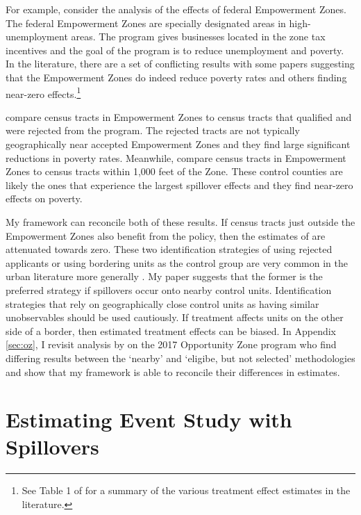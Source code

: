 \documentclass[11pt]{article}
\begin{document}
For example, consider the analysis of the effects of federal Empowerment Zones. The federal Empowerment Zones are specially designated areas in high-unemployment areas. The program gives businesses located in the zone tax incentives and the goal of the program is to reduce unemployment and poverty. In the literature, there are a set of conflicting results with some papers suggesting that the Empowerment Zones do indeed reduce poverty rates and others finding near-zero effects.\footnote{See Table 1 of \citet{Neumark_Young_2019} for a summary of the various treatment effect estimates in the literature.} 

\citet{Busso_Gregory_Kline_2013} compare census tracts in Empowerment Zones to census tracts that qualified and were rejected from the program. The rejected tracts are not typically geographically near accepted Empowerment Zones and they find large significant reductions in poverty rates. Meanwhile, \citet{Neumark_Kolko_2010} compare census tracts in Empowerment Zones to census tracts within 1,000 feet of the Zone. These control counties are likely the ones that experience the largest spillover effects and they find near-zero effects on poverty. 

My framework can reconcile both of these results. If census tracts just outside the Empowerment Zones also benefit from the policy, then the estimates of \citet{Neumark_Kolko_2010} are attenuated towards zero. These two identification strategies of using rejected applicants or using bordering units as the control group are very common in the urban literature more generally \citep{Baum-Snow_Ferreira_2015}. My paper suggests that the former is the preferred strategy if spillovers occur onto nearby control units. Identification strategies that rely on geographically close control units as having similar unobservables should be used cautiously. If treatment affects units on the other side of a border, then estimated treatment effects can be biased. In Appendix \ref{sec:oz}, I revisit analysis by \citet{Chen_Glaeser_Wessel_2021} on the 2017 Opportunity Zone program who find differing results between the `nearby' and `eligibe, but not selected' methodologies and show that my framework is able to reconcile their differences in estimates.


\section{Estimating Event Study with Spillovers}
\label{sec:event_study}
\end{document}
